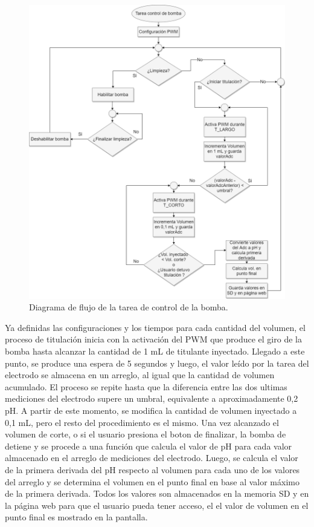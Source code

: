 \begin{figure}[htbp]
	\centering
	\includegraphics[width=1.0\textwidth]{./Figures/motorBomba.png}
	\caption{Diagrama de flujo de la tarea de control de la bomba.}
	\label{fig:flujoBomba}
\end{figure}

Ya definidas las configuraciones y los tiempos para cada cantidad del volumen, el proceso de titulación inicia con la activación del PWM que produce el giro de la bomba hasta alcanzar la cantidad de 1 mL de titulante inyectado. Llegado a este punto, se produce una espera de 5 segundos y luego, el valor leído por la tarea del electrodo se almacena en un arreglo, al igual que la cantidad de volumen acumulado. El proceso se repite hasta que la diferencia entre las dos ultimas mediciones del electrodo supere un umbral, equivalente a aproximadamente 0,2 pH. A partir de este momento, se modifica la cantidad de volumen inyectado a 0,1 mL, pero el resto del procedimiento es el mismo. Una vez alcanzado el volumen de corte, o si el usuario presiona el boton de finalizar, la bomba de detiene y se procede a una función que calcula el valor de pH para cada valor almacenado en el arreglo de mediciones del electrodo. Luego, se calcula el valor de la primera derivada del pH respecto al volumen para cada uno de los valores del arreglo y se determina el volumen en el punto final en base al valor máximo de la primera derivada. Todos los valores son almacenados en la memoria SD y en la página web para que el usuario pueda tener acceso, el el valor de volumen en el punto final es mostrado en la pantalla.


